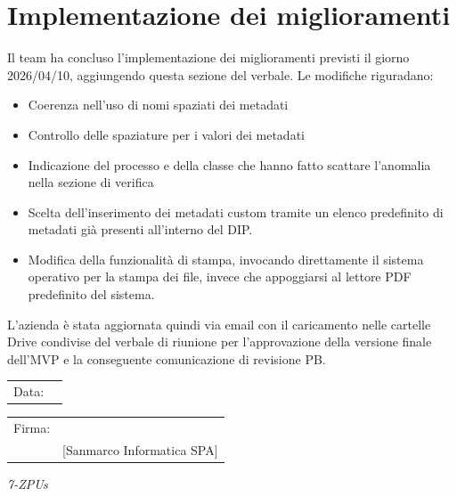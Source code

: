 \documentclass[a4paper,12pt]{article}
\begin{document}
\section{Implementazione dei miglioramenti}
Il team ha concluso l'implementazione dei miglioramenti previsti il giorno 2026/04/10, aggiungendo questa sezione del verbale.
Le modifiche riguradano:
\begin{itemize}
    \item Coerenza nell'uso di nomi spaziati dei metadati
    \item Controllo delle spaziature per i valori dei metadati
    \item Indicazione del processo e della classe che hanno fatto scattare l'anomalia nella sezione di verifica
    \item Scelta dell'inserimento dei metadati custom tramite un elenco predefinito di metadati già presenti all'interno del DIP.
    \item Modifica della funzionalità di stampa, invocando direttamente il sistema operativo per la stampa dei file, invece che appoggiarsi al lettore PDF predefinito del sistema.
\end{itemize}
L'azienda è stata aggiornata quindi via email con il caricamento nelle cartelle Drive condivise del verbale di riunione per l'approvazione della versione finale dell'MVP e la conseguente comunicazione di revisione PB.
 \vfill
\begin{flushleft}
    \begin{tabular}{@{}p{0.5in}p{2in}@{}}
        Data: & \hrulefill \\
    \end{tabular}

    \vspace{1em}

    \begin{tabular}{@{}p{0.5in}p{2in}@{}}
        Firma: & \hrulefill                 \\
               & [Sanmarco Informatica SPA] \\
    \end{tabular}
\end{flushleft}

\begin{flushright}
    \textit{7-ZPUs}
\end{flushright}
\end{document}
